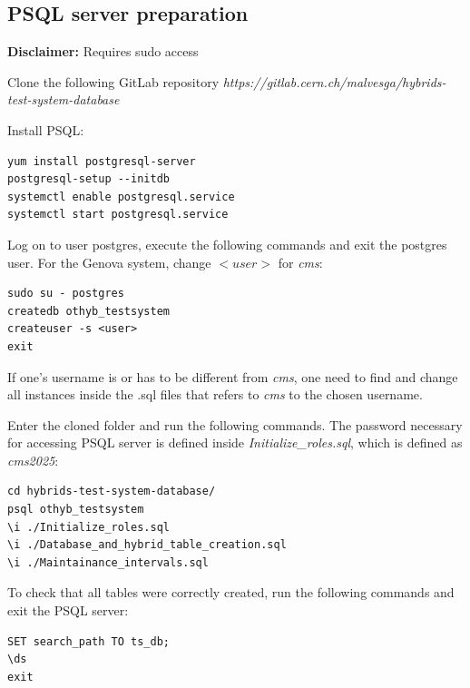 \documentclass[10pt,a4paper]{article}
\begin{document}
\subsection{PSQL server preparation}

\textbf{Disclaimer:} Requires sudo access

Clone the following GitLab repository \emph{https://gitlab.cern.ch/malvesga/hybrids-test-system-database}

Install PSQL: 

\begin{framed}
\begin{verbatim}
yum install postgresql-server
postgresql-setup --initdb
systemctl enable postgresql.service
systemctl start postgresql.service
\end{verbatim}
\end{framed}

Log on to user postgres, execute the following commands and exit the postgres user. For the Genova system, change $<user>$ for \textit{cms}: 

\begin{framed}
\begin{verbatim}
sudo su - postgres
createdb othyb_testsystem
createuser -s <user>
exit
\end{verbatim}
\end{framed}

If one's username is or has to be different from \textit{cms}, one need to find and change all instances inside the .sql files that refers to \textit{cms} to the chosen username.

Enter the cloned folder and run the following commands. The password necessary for accessing PSQL server is defined inside \emph{Initialize\_roles.sql}, which is defined as \textit{cms2025}:

\begin{framed}
\begin{verbatim}
cd hybrids-test-system-database/
psql othyb_testsystem 
\i ./Initialize_roles.sql 
\i ./Database_and_hybrid_table_creation.sql 
\i ./Maintainance_intervals.sql 
\end{verbatim}
\end{framed}

To check that all tables were correctly created, run the following commands and exit the PSQL server: 

\begin{framed}
\begin{verbatim}
SET search_path TO ts_db; 
\ds
exit
\end{verbatim}
\end{framed}
\end{document}
